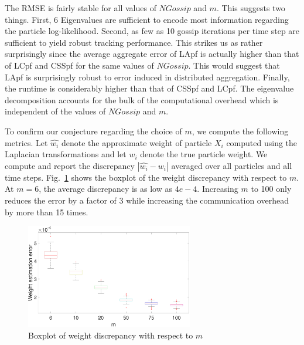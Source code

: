 \documentclass[10pt,letterpaper,final]{article}
\begin{document}
The RMSE is fairly stable for all values of $NGossip$ and $m$. This suggests two things. First, 6 Eigenvalues are sufficient to encode most information regarding the particle log-likelihood. Second, as few as 10 gossip iterations per time step are sufficient to yield robust tracking performance. This strikes us as rather surprisingly since the average aggregate error of LApf is actually higher than that of LCpf and CSSpf for the same values of $NGossip$. This would suggest that LApf is surprisingly robust to error induced in distributed aggregation. Finally, the runtime is considerably higher than that of CSSpf and LCpf.  The eigenvalue decomposition accounts for the bulk of the computational overhead which is independent of the values of $NGossip$ and $m$. 

To confirm our conjecture regarding the choice of $m$, we compute the following metrics. Let $\hat{w_i}$ denote the approximate weight of particle $X_i$ computed using the Laplacian transformations and let $w_i$ denote the true particle weight. We compute and report the discrepancy $|\hat{w_i}-w_i|$ averaged over all particles and all time steps. Fig.~\ref{fig:boxplot_LApf_weight_discrepancy} shows the boxplot of the weight discrepancy with respect to $m$. At $m=6$, the average discrepancy is as low as $4e-4$. Increasing $m$ to 100 only reduces the error by a factor of 3 while increasing the communication overhead by more than 15 times.  

\begin{figure}
\centering
\includegraphics[width=0.65\textwidth]{Figures/boxplot_LApf_weight_discrepancy}
\caption{Boxplot of weight discrepancy with respect to $m$}
\label{fig:boxplot_LApf_weight_discrepancy}
\end{figure}

\end{document}
